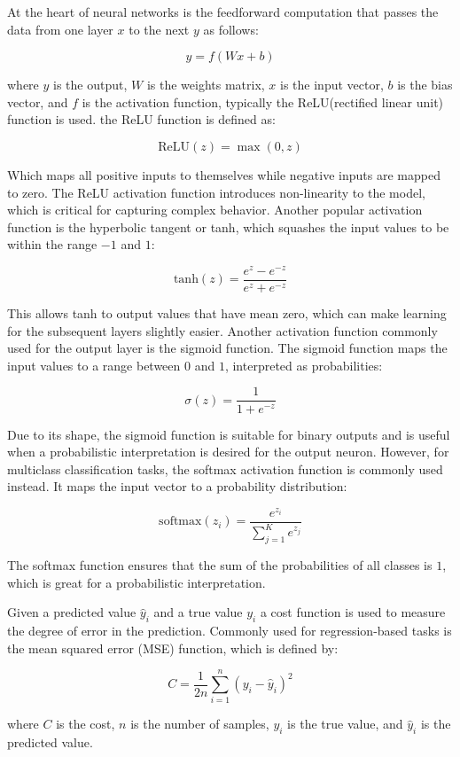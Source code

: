 \documentclass[11pt]{article}
\begin{document}
At the heart of neural networks is the feedforward computation that passes the data from one layer \(x\) to the next \(y\) as follows:

\[ y = f(Wx + b) \]

where \(y\) is the output, \(W\) is the weights matrix, \(x\) is the input vector, \(b\) is the bias vector, and \(f\) is the activation function, typically the ReLU(rectified linear unit) function is used. the ReLU function is defined as:

\[ \text{ReLU}(z) = \max(0, z) \]

Which maps all positive inputs to themselves while negative inputs are mapped to zero. The ReLU activation function introduces non-linearity to the model, which is critical for capturing complex behavior. Another popular activation function is the hyperbolic tangent or tanh, which squashes the input values to be within the range \(-1\) and \(1\):

\[
\text{tanh}(z) = \frac{e^{z} - e^{-z}}{e^{z} + e^{-z}}
\]

This allows tanh to output values that have mean zero, which can make learning for the subsequent layers slightly easier. Another activation function commonly used for the output layer is the sigmoid function. The sigmoid function maps the input values to a range between \(0\) and \(1\), interpreted as probabilities:

\[
\sigma(z) = \frac{1}{1 + e^{-z}}
\]

Due to its shape, the sigmoid function is suitable for binary outputs and is useful when a probabilistic interpretation is desired for the output neuron. However, for multiclass classification tasks, the softmax activation function is commonly used instead. It maps the input vector to a probability distribution:

\[
\text{softmax}(z_i) = \frac{e^{z_i}}{\sum_{j=1}^{K} e^{z_j}}
\]

The softmax function ensures that the sum of the probabilities of all classes is \(1\), which is great for a probabilistic interpretation.

Given a predicted value \(\hat{y}_i\) and a true value \(y_i\) a cost function is used to measure the degree of error in the prediction. Commonly used for regression-based tasks is the mean squared error (MSE) function, which is defined by:

\[ C = \frac{1}{2n} \sum_{i=1}^{n} (y_i - \hat{y}_i)^2 \]

where \(C\) is the cost, \(n\) is the number of samples, \(y_i\) is the true value, and \(\hat{y}_i\) is the predicted value.
\end{document}
